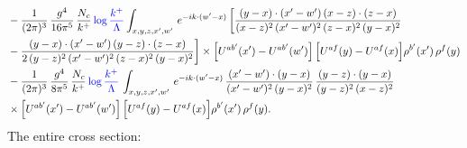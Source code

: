 \documentclass[9pt]{article}
\numberwithin{equation}{section}
\begin{document}
\begin{align}
&-\frac{1}{(2\pi)^{3}}\,\frac{g^{4}}{16\pi^{5}}\,\frac{N_{c}}{k^{+}}\,{\color{blue}\log\frac{k^{+}}{\Lambda}}\int_{x,y,z,x',w'}\,e^{-ik\cdot(w'-x)}\,\bigg[\frac{(y-x)\cdot (x'-w')\,(x-z)\cdot (z-x)}{(x-z)^{2}\,(x'-w')^{2}\,(z-x)^{2}\,(y-x)^{2}}\notag \\ & -\frac{(y-x)\cdot (x'-w')\,(y-z)\cdot (z-x)}{2\,(y-z)^{2}\,(x'-w')^{2}\,(z-x)^{2}\,(y-x)^{2}}\bigg]\times\Big[U^{ab'}(x')-U^{ab'}(w')\Big]\,\Big[U^{af}(y)-U^{af}(x)\Big]\rho^{b'}(x')\,\rho^{f}(y)\notag\\
&-\frac{1}{(2\pi)^{3}}\,\frac{g^{4}}{8\pi^{5}}\,\frac{N_{c}}{k^{+}}\,{\color{blue}\log\frac{k^{+}}{\Lambda}}\,\int_{x,y,z,x',w'}\,e^{-ik\cdot(w'-x)}\,\frac{(x'-w')\cdot(y-x)}{(x'-w')^{2}\,(y-x)^{2}}\,\frac{(y-z)\cdot(y-x)}{(y-z)^{2}\,(x-z)^{2}}\notag\\
&\times\Big[U^{ab'}(x')-U^{ab'}(w')\Big]\,\Big[U^{af}(y)-U^{af}(x)\Big]\rho^{b'}(x')\,\rho^{f}(y).
\end{align}
The entire cross section: 
\end{document}

